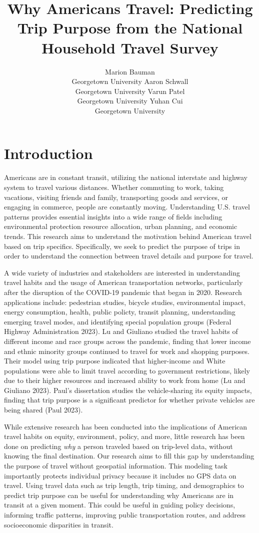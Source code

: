 \documentclass[
  article,
  nofooter]{jss}
\author{Marion Bauman\\Georgetown University \And Aaron
Schwall\\Georgetown University \AND Varun Patel\\Georgetown
University \And Yuhan Cui\\Georgetown University}
\title{Why Americans Travel: Predicting Trip Purpose from the National
Household Travel Survey}
\begin{document}
\maketitle

\section{Introduction}\label{introduction}

Americans are in constant transit, utilizing the national interstate and
highway system to travel various distances. Whether commuting to work,
taking vacations, visiting friends and family, transporting goods and
services, or engaging in commerce, people are constantly moving.
Understanding U.S. travel patterns provides essential insights into a
wide range of fields including environmental protection resource
allocation, urban planning, and economic trends. This research aims to
understand the motivation behind American travel based on trip
specifics. Specifically, we seek to predict the purpose of trips in
order to understand the connection between travel details and purpose
for travel.

A wide variety of industries and stakeholders are interested in
understanding travel habits and the usage of American transportation
networks, particularly after the disruption of the COVID-19 pandemic
that began in 2020. Research applications include: pedestrian studies,
bicycle studies, environmental impact, energy consumption, health,
public policty, transit planning, understanding emerging travel modes,
and identifying special population groups (Federal Highway
Administration 2023). Lu and Giuliano studied the travel habits of
different income and race groups across the pandemic, finding that lower
income and ethnic minority groups continued to travel for work and
shopping purposes. Their model using trip purpose indicated that
higher-income and White populations were able to limit travel according
to government restrictions, likely due to their higher resources and
increased ability to work from home (Lu and Giuliano 2023). Paul's
dissertation studies the vehicle-sharing its equity impacts, finding
that trip purpose is a significant predictor for whether private
vehicles are being shared (Paul 2023).

While extensive research has been conducted into the implications of
American travel habits on equity, environment, policy, and more, little
research has been done on predicting \emph{why} a person traveled based
on trip-level data, without knowing the final destination. Our research
aims to fill this gap by understanding the purpose of travel without
geospatial information. This modeling task importantly protects
individual privacy because it includes no GPS data on travel. Using
travel data such as trip length, trip timing, and demographics to
predict trip purpose can be useful for understanding why Americans are
in transit at a given moment. This could be useful in guiding policy
decisions, informing traffic patterns, improving public transportation
routes, and address socioeconomic disparities in transit.
\end{document}
